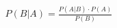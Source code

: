 \documentclass[preview]{standalone}
\begin{document}
\begin{align*}
P(B|A) = \frac{P(A|B) \cdot P(A)}{P(B)}
\end{align*}
\end{document}
